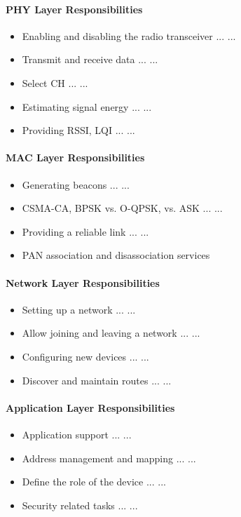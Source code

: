 \paragraph{PHY Layer Responsibilities}
\begin{itemize}
\item Enabling and disabling the radio transceiver ... ...
\item Transmit and receive data ... ...
\item Select CH ... ...
\item Estimating signal energy ... ...
\item Providing RSSI, LQI ... ...
\end{itemize}
\paragraph{MAC Layer Responsibilities}
\begin{itemize}
\item Generating beacons ... ...
\item CSMA-CA, BPSK vs. O-QPSK, vs. ASK ... ...
\item Providing a reliable link ... ...
\item PAN association and disassociation services
\end{itemize}
\paragraph{Network Layer Responsibilities}
\begin{itemize}
\item Setting up a network ... ...
\item Allow joining and leaving a network ... ...
\item Configuring new devices ... ...
\item Discover and maintain routes ... ...
\end{itemize}
\paragraph{Application Layer Responsibilities}
\begin{itemize}
\item Application support ... ...
\item Address management and mapping ... ...
\item Define the role of the device ... ...
\item Security related tasks ... ...
\end{itemize}
